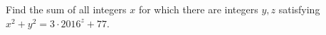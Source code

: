 Find the sum of all integers $x$ for which there are integers $y,z$ satisfying $x^2+y^2=3\cdot2016^z+77$.
